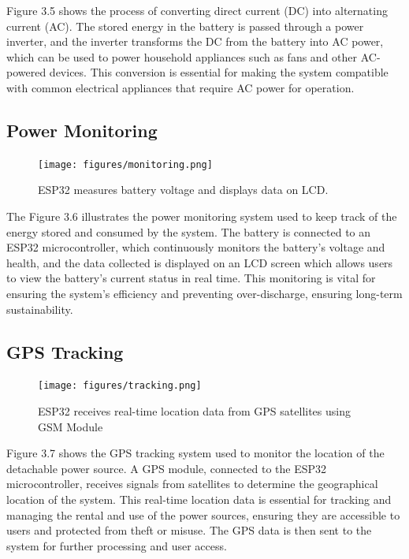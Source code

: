 {Figure 3.5 shows the process of converting direct current (DC) into alternating current (AC). The stored energy in the  battery is passed through a power inverter, and the inverter transforms the DC from the battery into AC power, which can be used to power household appliances such as fans and other AC-powered devices. This conversion is essential for making the system compatible with common electrical appliances that require AC power for operation.

\subsection{Power Monitoring}

\begin{figure}[H]
	\centering
	\caption{ESP32 measures battery voltage and displays data on LCD.}
	\label{fig:power monitoring}
	\texttt{[image: figures/monitoring.png]}
\end{figure}

The Figure 3.6 illustrates the power monitoring system used to keep track of the energy stored and consumed by the system. The  battery is connected to an ESP32 microcontroller, which continuously monitors the battery’s voltage and health, and the data collected is displayed on an LCD screen which allows users to view the battery's current status in real time. This monitoring is vital for ensuring the system's efficiency and preventing over-discharge, ensuring long-term sustainability.


\subsection{GPS Tracking}

\begin{figure}[H]
	\centering
	\caption{ESP32 receives real-time location data from GPS satellites using GSM Module}
	\label{fig:gps tracking}
	\texttt{[image: figures/tracking.png]}
\end{figure}

Figure 3.7 shows the GPS tracking system used to monitor the location of the detachable power source. A GPS module, connected to the ESP32 microcontroller, receives signals from satellites to determine the geographical location of the system. This real-time location data is essential for tracking and managing the rental and use of the power sources, ensuring they are accessible to users and protected from theft or misuse. The GPS data is then sent to the system for further processing and user access.


}
